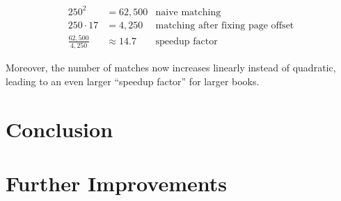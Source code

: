 \documentclass{ltjarticle}
\begin{document}
\begin{align*}
    250^2 &= 62,500 & \text{naive matching} \\
    250 \cdot 17 &= 4,250 & \text{matching after fixing page offset} \\
    \frac{62,500}{4,250} &\approx 14.7 & \text{speedup factor}
\end{align*}

Moreover, the number of matches now increases linearly instead of quadratic, leading to an even larger “speedup factor” for larger books.

\section{Conclusion}

\section{Further Improvements}

\printbibliography
\end{document}
